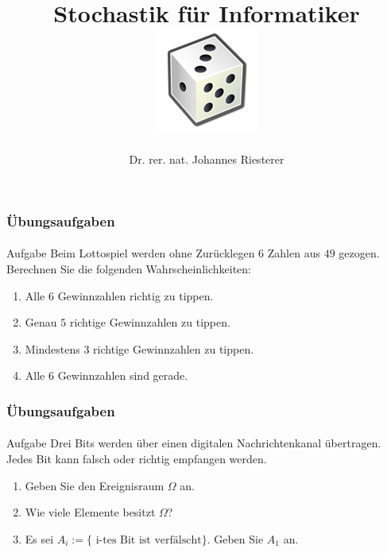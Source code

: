 \documentclass{beamer}
\begin{document}
\title[Stochastik] %
{Stochastik für Informatiker
\\
\includegraphics[scale=0.5]{img/craps}
}
\subtitle{}
\author[Dr. Johannes Riesterer] %
{Dr.  rer. nat. Johannes Riesterer}

\date[KPT 2004] %
{}

\subject{Stochastik}

\frame{\titlepage}

\begin{frame}
    \frametitle{Übungsaufgaben}
\framesubtitle{}
\begin{block}{Aufgabe}
Beim Lottospiel werden ohne Zurücklegen $6$ Zahlen aus $49$ gezogen. Berechnen Sie die folgenden Wahrscheinlichkeiten:
\begin{enumerate}
\item Alle $6$ Gewinnzahlen richtig zu tippen.
\item Genau $5$ richtige Gewinnzahlen zu tippen.
\item Mindestens $3$ richtige Gewinnzahlen zu tippen.
\item Alle $6$ Gewinnzahlen sind gerade.
\end{enumerate}
\end{block}
 \end{frame}



\begin{frame}
    \frametitle{Übungsaufgaben}
\framesubtitle{}
\begin{block}{Aufgabe}
Drei Bits werden über einen digitalen Nachrichtenkanal übertragen. Jedes Bit kann falsch oder richtig empfangen werden.
\begin{enumerate}
\item Geben Sie den Ereignisraum $\Omega$ an.
\item Wie viele Elemente besitzt $\Omega$?
\item Es sei $A_i := \{ \text{ i-tes Bit ist verfälscht}\}$. Geben Sie $A_1$ an.
\end{enumerate}
\end{block}

 \end{frame}
\end{document}
